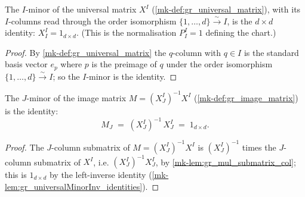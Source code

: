 \begin{lemma}\label{mk-lem:gr_universalMatrix_submatrix_self}
  \leanok

  The \(I\)-minor of the universal matrix \(X^I\)
  (\ref{mk-def:gr_universal_matrix}), with its \(I\)-columns read through the order
  isomorphism \(\{1,\dots,d\} \xrightarrow{\sim} I\), is the \(d\times d\)
  identity: \(X^I_I = 1_{d\times d}\). (This is the normalisation \(P^I_I = 1\)
  defining the chart.)
\end{lemma}
\begin{proof}
  \leanok

By \ref{mk-def:gr_universal_matrix} the \(q\)-column with \(q \in I\) is the
  standard basis vector \(e_p\) where \(p\) is the preimage of \(q\) under the
  order isomorphism \(\{1,\dots,d\} \xrightarrow{\sim} I\); so the \(I\)-minor
  is the identity.
\end{proof}

\begin{lemma}\label{mk-lem:gr_imageMatrix_submatrix_self}
  \leanok

  The \(J\)-minor of the image matrix \(M = (X^I_J)^{-1} X^I\)
  (\ref{mk-def:gr_image_matrix}) is the identity:
  \[
    M_J \;=\; (X^I_J)^{-1}\, X^I_J \;=\; 1_{d\times d}.
  \]
\end{lemma}
\begin{proof}
  \leanok

The \(J\)-column submatrix of \(M = (X^I_J)^{-1} X^I\) is
  \((X^I_J)^{-1}\) times the \(J\)-column submatrix of \(X^I\), i.e.
  \((X^I_J)^{-1} X^I_J\), by \ref{mk-lem:gr_mul_submatrix_col}; this is
  \(1_{d\times d}\) by the left-inverse identity
  (\ref{mk-lem:gr_universalMinorInv_identities}).
\end{proof}



